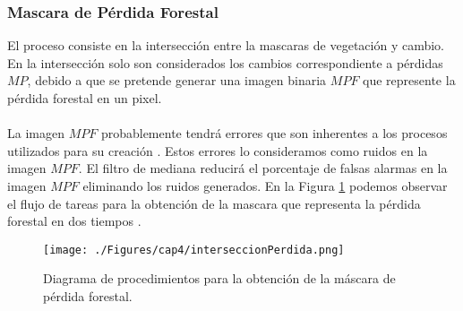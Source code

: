 \subsubsection{Mascara de P\'erdida Forestal}
El proceso consiste en la intersecci\'on entre la mascaras de vegetaci\'on y cambio. En la intersecci\'on solo son considerados los cambios correspondiente a p\'erdidas  $ MP $, debido a que se pretende generar una imagen binaria $ MPF $ que represente la p\'erdida forestal en un pixel.\\~\\
La imagen $ MPF $ probablemente tendr\'a errores que son inherentes a los procesos utilizados para su creaci\'on \cite{lovell2001filtering}. Estos errores lo consideramos como ruidos en la imagen $ MPF $. El filtro de mediana \cite{gonzalez2002woods} reducir\'a el porcentaje de falsas alarmas en la imagen $ MPF $ eliminando los ruidos generados.
En la Figura \ref{fig:intersPerdida} podemos observar el flujo de tareas para la obtenci\'on de la mascara que representa la p\'erdida forestal en dos tiempos .
\begin{figure}[H]
	\centering
	\texttt{[image: ./Figures/cap4/interseccionPerdida.png]}
	\caption{Diagrama de procedimientos para la obtenci\'on de la m\'ascara de p\'erdida forestal.}
	\label{fig:intersPerdida}
\end{figure}

